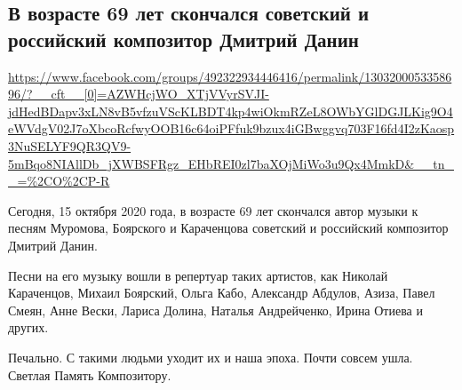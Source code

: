  

 

\subsection{В возрасте 69 лет скончался советский и российский композитор Дмитрий Данин}

\url{https://www.facebook.com/groups/492322934446416/permalink/1303200053358696/?__cft__[0]=AZWHcjWO_XTjVVyrSVJI-jdHedBDapv3xLN8vB5vfzuVScKLBDT4kp4wiOkmRZeL8OWbYGlDGJLKig9O4eWVdgV02J7oXbcoRcfwyOOB16c64oiPFfuk9bzux4iGBwggvq703F16fd4I2zKaosp3NuSELYF9QR3QV9-5mBqo8NIAllDb_jXWBSFRgz_EHbREI0zl7baXOjMiWo3u9Qx4MmkD&__tn__=%2CO%2CP-R}

Сегодня, 15 октября 2020 года, в возрасте 69 лет скончался автор музыки к
песням Муромова, Боярского и Караченцова советский и российский композитор
Дмитрий Данин.  

Песни на его музыку вошли в репертуар таких артистов, как Николай Караченцов,
Михаил Боярский, Ольга Кабо, Александр Абдулов, Азиза, Павел Смеян, Анне Вески,
Лариса Долина, Наталья Андрейченко, Ирина Отиева и других.

Печально. С такими людьми уходит их и наша эпоха. Почти совсем ушла. Светлая Память Композитору.


